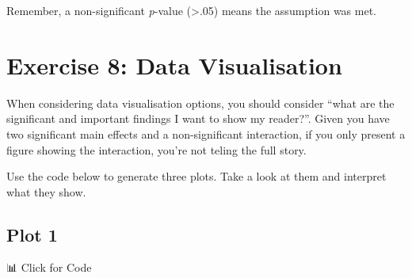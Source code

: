\documentclass[
]{book}
\let\oldsection\section
\renewcommand{\section}{\needspace{5\baselineskip}\oldsection}
\let\oldsubsection\subsection
\renewcommand{\subsection}{\needspace{3\baselineskip}\oldsubsection}  %
\begin{document}
Remember, a non-significant \emph{p}-value (\textgreater.05) means the assumption was met.

\section{Exercise 8: Data Visualisation}\label{exercise-8-data-visualisation}

When considering data visualisation options, you should consider ``what are the significant and important findings I want to show my reader?''. Given you have two significant main effects and a non-significant interaction, if you only present a figure showing the interaction, you're not teling the full story.

Use the code below to generate three plots. Take a look at them and interpret what they show.

\subsection{Plot 1}\label{plot-1}

📊 Click for Code
\end{document}
